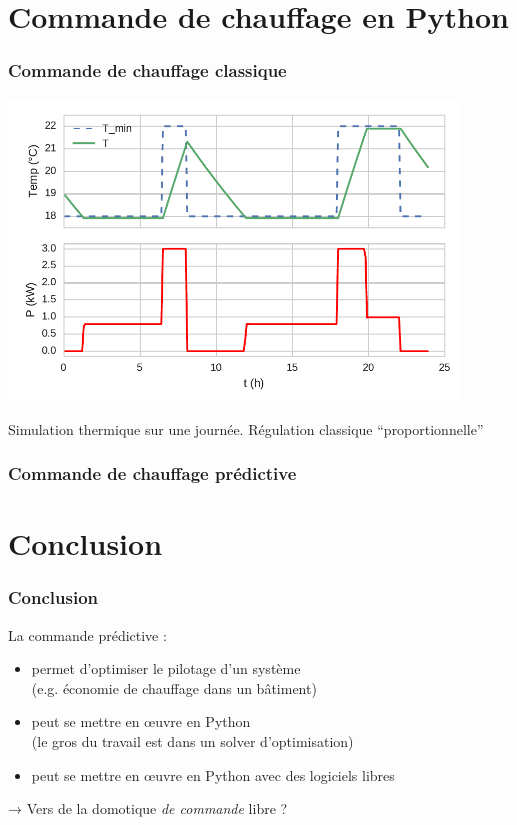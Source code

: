 \section{Commande de chauffage en Python}

\begin{frame}
  \frametitle{Commande de chauffage classique}
 
  \begin{center}
    \includegraphics[width=0.9\textwidth]{notebook/sim_Prop_fback.pdf}
    
    \footnotesize
     Simulation thermique sur une journée. Régulation classique ``proportionnelle''
  \end{center}
\end{frame}

\begin{frame}
  \frametitle{Commande de chauffage prédictive}

\end{frame}


\section{Conclusion}



\begin{frame}[c]
  \frametitle{Conclusion}
  
  \begin{block}{La commande prédictive :}
  \begin{itemize}
   \item permet d'optimiser le pilotage d'un système\\ (e.g. économie de chauffage dans un bâtiment)
   \item peut se mettre en œuvre en Python \\(le gros du travail est dans un solver d'optimisation)
   \item peut se mettre en œuvre en Python avec des logiciels libres
  \end{itemize}
  \end{block}
  
  \pause
  \begin{block}{}
   → Vers de la domotique \emph{de commande} libre ?
  \end{block}


  
\end{frame}

